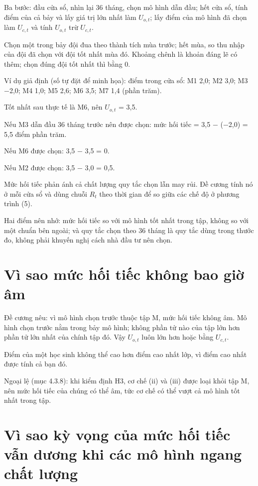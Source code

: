 Ba bước: đầu cửa sổ, nhìn lại 36 tháng, chọn mô hình dẫn đầu; hết cửa sổ, tính điểm của cả bảy và lấy giá trị lớn nhất làm \(U_{o,t}\); lấy điểm của mô hình đã chọn làm \(U_{c,t}\) và tính \(U_{o,t}\) trừ \(U_{c,t}\).

Chọn một trong bảy đội đua theo thành tích mùa trước; hết mùa, so thu nhập của đội đã chọn với đội tốt nhất mùa đó. Khoảng chênh là khoản đáng lẽ có thêm; chọn đúng đội tốt nhất thì bằng 0.

\begin{tcolorbox}[breakable]
Ví dụ giả định (số tự đặt để minh họa): điểm trong cửa sổ: M1 2,0; M2 3,0; M3 −2,0; M4 1,0; M5 2,6; M6 3,5; M7 1,4 (phần trăm).

Tốt nhất sau thực tế là M6, nên \(U_{o,t}\) = 3,5.

Nếu M3 dẫn đầu 36 tháng trước nên được chọn: mức hối tiếc = 3,5 − (−2,0) = 5,5 điểm phần trăm.

Nếu M6 được chọn: 3,5 − 3,5 = 0.

Nếu M2 được chọn: 3,5 − 3,0 = 0,5.
\end{tcolorbox}

Mức hối tiếc phản ánh cả chất lượng quy tắc chọn lẫn may rủi. Đề cương tính nó ở mỗi cửa sổ và dùng chuỗi \(R_{t}\) theo thời gian để so giữa các chế độ ở phương trình (5).

Hai điểm nên nhớ: mức hối tiếc so với mô hình tốt nhất trong tập, không so với một chuẩn bên ngoài; và quy tắc chọn theo 36 tháng là quy tắc dùng trong thước đo, không phải khuyến nghị cách nhà đầu tư nên chọn.

\section{Vì sao mức hối tiếc không bao giờ âm}

Đề cương nêu: vì mô hình chọn trước thuộc tập M, mức hối tiếc không âm. Mô hình chọn trước nằm trong bảy mô hình; không phần tử nào của tập lớn hơn phần tử lớn nhất của chính tập đó. Vậy \(U_{o,t}\) luôn lớn hơn hoặc bằng \(U_{c,t}\).

Điểm của một học sinh không thể cao hơn điểm cao nhất lớp, vì điểm cao nhất được tính cả bạn đó.

Ngoại lệ (mục 4.3.8): khi kiểm định H3, cơ chế (ii) và (iii) được loại khỏi tập M, nên mức hối tiếc của chúng có thể âm, tức cơ chế có thể vượt cả mô hình tốt nhất trong tập.

\section{Vì sao kỳ vọng của mức hối tiếc vẫn dương khi các mô hình ngang chất lượng}

